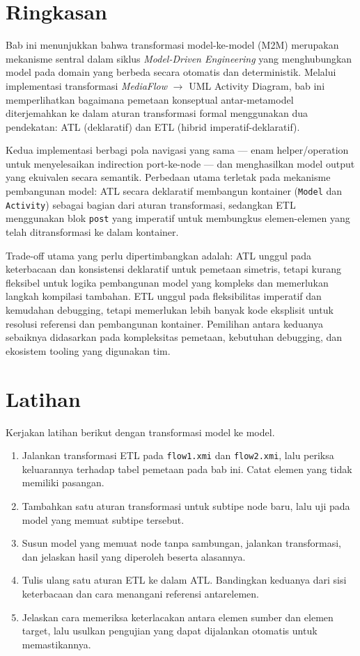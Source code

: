 \section{Ringkasan}

Bab ini menunjukkan bahwa transformasi model-ke-model (M2M) merupakan mekanisme sentral dalam siklus \textit{Model-Driven Engineering} yang menghubungkan model pada domain yang berbeda secara otomatis dan deterministik. Melalui implementasi transformasi \textit{MediaFlow} $\rightarrow$ UML Activity Diagram, bab ini memperlihatkan bagaimana pemetaan konseptual antar-metamodel diterjemahkan ke dalam aturan transformasi formal menggunakan dua pendekatan: ATL (deklaratif) dan ETL (hibrid imperatif-deklaratif).

Kedua implementasi berbagi pola navigasi yang sama --- enam helper/operation untuk menyelesaikan indirection port-ke-node --- dan menghasilkan model output yang ekuivalen secara semantik. Perbedaan utama terletak pada mekanisme pembangunan model: ATL secara deklaratif membangun kontainer (\texttt{Model} dan \texttt{Activity}) sebagai bagian dari aturan transformasi, sedangkan ETL menggunakan blok \texttt{post} yang imperatif untuk membungkus elemen-elemen yang telah ditransformasi ke dalam kontainer.

Trade-off utama yang perlu dipertimbangkan adalah: ATL unggul pada keterbacaan dan konsistensi deklaratif untuk pemetaan simetris, tetapi kurang fleksibel untuk logika pembangunan model yang kompleks dan memerlukan langkah kompilasi tambahan. ETL unggul pada fleksibilitas imperatif dan kemudahan debugging, tetapi memerlukan lebih banyak kode eksplisit untuk resolusi referensi dan pembangunan kontainer. Pemilihan antara keduanya sebaiknya didasarkan pada kompleksitas pemetaan, kebutuhan debugging, dan ekosistem tooling yang digunakan tim.

\section{Latihan}

Kerjakan latihan berikut dengan transformasi model ke model.

\begin{enumerate}
  \item Jalankan transformasi ETL pada \texttt{flow1.xmi} dan \texttt{flow2.xmi}, lalu periksa keluarannya terhadap tabel pemetaan pada bab ini. Catat elemen yang tidak memiliki pasangan.
  \item Tambahkan satu aturan transformasi untuk subtipe node baru, lalu uji pada model yang memuat subtipe tersebut.
  \item Susun model yang memuat node tanpa sambungan, jalankan transformasi, dan jelaskan hasil yang diperoleh beserta alasannya.
  \item Tulis ulang satu aturan ETL ke dalam ATL. Bandingkan keduanya dari sisi keterbacaan dan cara menangani referensi antarelemen.
  \item Jelaskan cara memeriksa keterlacakan antara elemen sumber dan elemen target, lalu usulkan pengujian yang dapat dijalankan otomatis untuk memastikannya.
\end{enumerate}

